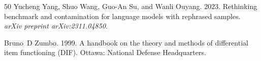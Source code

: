 \documentclass[11pt,a4paper]{article}
\begin{document}
\begin{thebibliography}{50}
Yucheng Yang, Shuo Wang, Guo-An Su, and Wanli Ouyang. 2023.
\newblock Rethinking benchmark and contamination for language models with rephrased samples.
\newblock \emph{arXiv preprint arXiv:2311.04850}.

Bruno~D Zumbo. 1999.
\newblock A handbook on the theory and methods of differential item functioning ({DIF}).
\newblock Ottawa: National Defense Headquarters.

\end{thebibliography}
\end{document}
